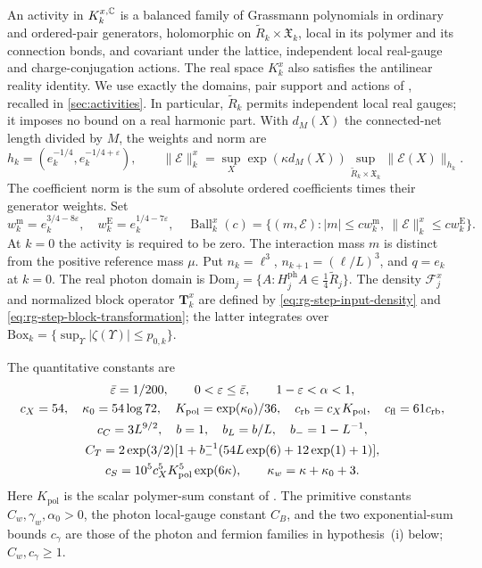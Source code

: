 An activity in $K_k^{x,\mathbb C}$ is a balanced family of Grassmann
polynomials in ordinary and ordered-pair generators, holomorphic on
$\widetilde R_k\times\mathfrak X_k$, local in its polymer and its
connection bonds, and covariant under the lattice, independent local
real-gauge and charge-conjugation actions. The real space $K_k^x$
also satisfies the antilinear reality identity. We use exactly the
domains, pair support and actions of \cite[\S2]{NormalizedContraction},
recalled in \cref{sec:activities}. In particular, $\widetilde R_k$
permits independent local real gauges; it imposes no bound on a real
harmonic part. With $d_M(X)$ the connected-net length divided by $M$,
the weights and norm are
\[
 h_k=(e_k^{-1/4},e_k^{-1/4+\varepsilon}),\qquad
 \|\mathscr E\|_k^x=\sup_X\exp(\kappa d_M(X))
       \sup_{\widetilde R_k\times\mathfrak X_k}\|\mathscr E(X)\|_{h_k}.
\]
The coefficient norm is the sum of absolute ordered coefficients
times their generator weights. Set
\begin{equation}\label{eq:rg-windows}
 w_k^{\mathrm m}=e_k^{3/4-8\varepsilon},\quad
 w_k^{\mathrm E}=e_k^{1/4-7\varepsilon},\quad
 \operatorname{Ball}_k^x(c)=
 \{(m,\mathscr E):|m|\le cw_k^{\mathrm m},\
                 \|\mathscr E\|_k^x\le cw_k^{\mathrm E}\}.
\end{equation}
At $k=0$ the activity is required to be zero. The interaction mass
$m$ is distinct from the positive reference mass $\mu$. Put
$n_k=\ell^3$, $n_{k+1}=(\ell/L)^3$, and $q=e_k$ at $k=0$.
The real photon domain is
$\mathrm{Dom}_j=\{A:H_j^{\mathrm{ph}}A\in\frac14\widetilde R_j\}$.
The density $\mathscr F_j^x$ and normalized block operator $\mathbf T_k^x$
are defined by \eqref{eq:rg-step-input-density} and
\eqref{eq:rg-step-block-transformation}; the latter integrates over
$\mathrm{Box}_k=\{\sup_\Upsilon|\zeta(\Upsilon)|\le p_{0,k}\}$.

The quantitative constants are
\[
 \begin{gathered}
 \bar\varepsilon=1/200,\qquad
 0<\varepsilon\le\bar\varepsilon,\qquad 1-\varepsilon<\alpha<1,\\
 c_X=54,\quad \kappa_0=54\log72,\quad K_{\mathrm{pol}}=\exp(\kappa_0)/36,\quad
 c_{\rm rb}=c_XK_{\mathrm{pol}},\quad c_{\rm fl}=61c_{\rm rb},\\
 c_C=3L^{9/2},\quad b=1,\quad b_L=b/L,\quad b_-=1-L^{-1},\\
 C_T=2\exp(3/2)
       [1+b_-^{-1}(54L\exp(6)+12\exp(1)+1)],\\
 c_S=10^5c_X^5K_{\mathrm{pol}}^5\exp(6\kappa),\qquad
 \kappa_w=\kappa+\kappa_0+3 .
 \end{gathered}
\]
Here $K_{\mathrm{pol}}$ is the scalar polymer-sum constant of
\cite[Appendix~B, (81)]{NormalizedContraction}.
The primitive constants \(C_w,\gamma_w,\alpha_0>0\), the photon
local-gauge constant \(C_B\), and the two exponential-sum bounds
\(c_\gamma\) are those of the photon and fermion families in hypothesis~(i) below; \(C_w,c_\gamma\ge1\).


